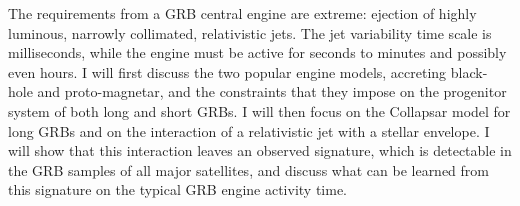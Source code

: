 


\bigskip



\bigskip

\noindent The requirements from a GRB central engine are extreme: ejection of highly luminous, narrowly collimated, relativistic jets. The jet variability time scale is milliseconds, while the engine must be active for seconds to minutes and possibly even hours. I will first discuss the two popular engine models, accreting black-hole and proto-magnetar, and the constraints that they impose on the progenitor system of both long and short GRBs.  I will then focus on the Collapsar model for long GRBs and on the interaction of a relativistic jet with a stellar envelope. I will show that this interaction leaves an observed signature, which is detectable in the GRB samples of all major satellites, and discuss what can be learned from this signature on the typical GRB engine activity time.
